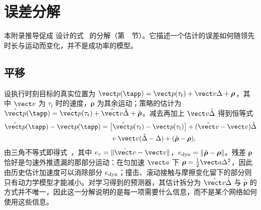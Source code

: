 \section{误差分解}
\label{app:analysis}

本附录推导促成 \ours 设计的式~ 的分解（第~~节）。它描述一个估计的误差如何随领先时长与运动而变化，并不是成功率的模型。

\subsection{平移}
\label{app:budget_translation}
设执行时刻目标的真实位置为 $\vect p(\tapp)=\vect p(\tau_t)+\vect v\Delta+\boldsymbol\rho$，其中 $\vect v$ 为 $\tau_t$ 时的速度，$\boldsymbol\rho$ 为其余运动；策略的估计为 $\hat{\vect p}(\tapp)=\hat{\vect p}(\tau_t)+\hat{\vect v}\hat\Delta+\hat{\boldsymbol\rho}$。减去再加上 $\vect v\hat\Delta$ 得到恒等式
\begin{equation}
\begin{aligned}
\hat{\vect p}(\tapp)-\vect p(\tapp)
={}&\big[\hat{\vect p}(\tau_t)-\vect p(\tau_t)\big]+(\hat{\vect v}-\vect v)\hat\Delta\\
&+\vect v(\hat\Delta-\Delta)+(\hat{\boldsymbol\rho}-\boldsymbol\rho),
\end{aligned}
\label{eq:budget_identity}
\end{equation}
由三角不等式即得式~，其中 $e_v=\|\hat{\vect v}-\vect v\|$，$e_{\rm dyn}=\|\hat{\boldsymbol\rho}-\boldsymbol\rho\|$。残差 $\boldsymbol\rho$ 恰好是匀速外推遗漏的那部分运动：在匀加速 $\vect a$ 下 $\boldsymbol\rho=\tfrac12\vect a\Delta^2$，因此由历史估计加速度可以消除部分 $e_{\rm dyn}$；撞击、滚动接触与摩擦变化留下的部分则只有动力学模型才能减小。对学习得到的预测器，其估计拆分为 $\hat{\vect v}\hat\Delta$ 与 $\hat{\boldsymbol\rho}$ 的方式并不唯一，因此这一分解说明的是每一项需要什么信息，而不是某个网络如何使用这些信息。

